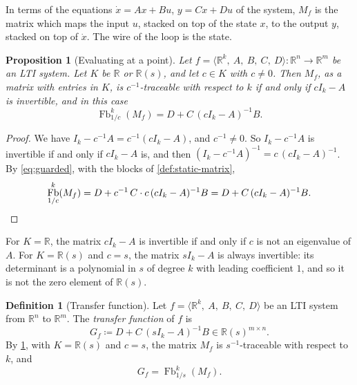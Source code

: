 \documentclass[11pt,a4paper]{article}
\theoremstyle{plain}
\newtheorem{proposition}[theorem]{Proposition}
\theoremstyle{definition}
\newtheorem{definition}[theorem]{Definition}
\theoremstyle{remark}
\DeclareMathOperator{\Fb}{Fb}
\newcommand{\R}{\mathbb{R}}
\newcommand{\Rs}{\mathbb{R}(s)}
\newcommand{\sys}[5]{\bigl\langle #1,\ #2,\ #3,\ #4,\ #5 \bigr\rangle}
\begin{document}
In terms of the equations $\dot x = A x + B u$, $y = C x + D u$ of the system, $M_f$ is the matrix which maps the input $u$, stacked on top of the state $x$, to the output $y$, stacked on top of $\dot x$.
The wire of the loop is the state.

\begin{proposition}[Evaluating at a point]
    \label{prop:evaluation}
    Let $f = \sys{\R^k}{A}{B}{C}{D} \colon \R^n \to \R^m$ be an LTI system.
    Let $K$ be $\R$ or $\Rs$, and let $c \in K$ with $c \neq 0$.
    Then $M_f$, as a matrix with entries in $K$, is $c^{-1}$-traceable with respect to $k$ if and only if $c I_k - A$ is invertible, and in this case
    \begin{equation}
        \label{eq:evaluation}
        \Fb^k_{1/c}(M_f) = D + C\, (c I_k - A)^{-1} B .
    \end{equation}
\end{proposition}

\begin{proof}
    We have $I_k - c^{-1} A = c^{-1} (c I_k - A)$, and $c^{-1} \neq 0$.
    So $I_k - c^{-1} A$ is invertible if and only if $c I_k - A$ is, and then $(I_k - c^{-1} A)^{-1} = c\, (c I_k - A)^{-1}$.
    By \cref{eq:guarded}, with the blocks of \cref{def:static-matrix},
    \begin{equation*}
        \Fb^k_{1/c}(M_f) = D + c^{-1}\, C \cdot c\, (c I_k - A)^{-1} B = D + C\, (c I_k - A)^{-1} B . \qedhere
    \end{equation*}
\end{proof}

For $K = \R$, the matrix $c I_k - A$ is invertible if and only if $c$ is not an eigenvalue of $A$.
For $K = \Rs$ and $c = s$, the matrix $s I_k - A$ is always invertible: its determinant is a polynomial in $s$ of degree $k$ with leading coefficient $1$, and so it is not the zero element of $\Rs$.

\begin{definition}[Transfer function]
    \label{def:transfer}
Let $f = \sys{\R^k}{A}{B}{C}{D}$ be an LTI system from $\R^n$ to $\R^m$.
    The \emph{transfer function} of $f$ is
    \begin{equation}
        \label{eq:transfer}
        G_f \coloneqq D + C\, (s I_k - A)^{-1} B \in \Rs^{m \times n} .
    \end{equation}
    By \cref{prop:evaluation}, with $K = \Rs$ and $c = s$, the matrix $M_f$ is $s^{-1}$-traceable with respect to $k$, and
    \begin{equation}
        \label{eq:transfer-as-fb}
        G_f = \Fb^k_{1/s}(M_f) .
    \end{equation}
\end{definition}
\end{document}
